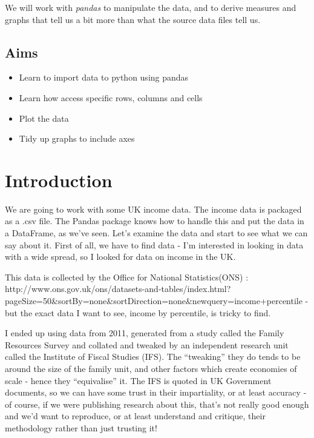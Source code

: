 \documentclass[
  letterpaper,
  DIV=11,
  numbers=noendperiod]{scrreprt}
\providecommand{\tightlist}{%
  \setlength{\itemsep}{0pt}\setlength{\parskip}{0pt}}\usepackage{longtable,booktabs,array}
\begin{document}
We will work with \emph{pandas} to manipulate the data, and to derive
measures and graphs that tell us a bit more than what the source data
files tell us.

\hypertarget{aims}{%
\subsection{Aims}\label{aims}}

\begin{itemize}
\tightlist
\item
  Learn to import data to python using pandas
\item
  Learn how access specific rows, columns and cells
\item
  Plot the data
\item
  Tidy up graphs to include axes
\end{itemize}

\hypertarget{introduction}{%
\section{Introduction}\label{introduction}}

We are going to work with some UK income data. The income data is
packaged as a .csv file. The Pandas package knows how to handle this and
put the data in a DataFrame, as we've seen. Let's examine the data and
start to see what we can say about it. First of all, we have to find
data - I'm interested in looking in data with a wide spread, so I looked
for data on income in the UK.

This data is collected by the Office for National Statistics(ONS) :
http://www.ons.gov.uk/ons/datasets-and-tables/index.html?pageSize=50\&sortBy=none\&sortDirection=none\&newquery=income+percentile
- but the exact data I want to see, income by percentile, is tricky to
find.

I ended up using data from 2011, generated from a study called the
Family Resources Survey and collated and tweaked by an independent
research unit called the Institute of Fiscal Studies (IFS). The
``tweaking'' they do tends to be around the size of the family unit, and
other factors which create economies of scale - hence they
``equivalise'' it. The IFS is quoted in UK Government documents, so we
can have some trust in their impartiality, or at least accuracy - of
course, if we were publishing research about this, that's not really
good enough and we'd want to reproduce, or at least understand and
critique, their methodology rather than just trusting it!
\end{document}
